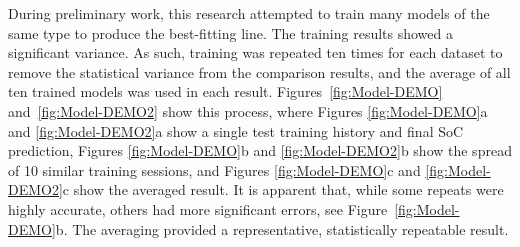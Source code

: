 %
During preliminary work, this research attempted to train many models of the same type to produce the best-fitting line.
The training results showed a significant variance.
As such, training was repeated ten times for each dataset to remove the statistical variance from the comparison results, and the average of all ten trained models was used in each result.
Figures~\ref{fig:Model-DEMO} and~\ref{fig:Model-DEMO2} show this process, where Figures \ref{fig:Model-DEMO}a and \ref{fig:Model-DEMO2}a show a single test training history and final SoC prediction, Figures \ref{fig:Model-DEMO}b and \ref{fig:Model-DEMO2}b show the spread of 10 similar training sessions, and Figures \ref{fig:Model-DEMO}c and \ref{fig:Model-DEMO2}c show the averaged result.
It is apparent that, while some repeats were highly accurate, others had more significant errors, see Figure~\ref{fig:Model-DEMO}b.
The averaging provided a representative, statistically repeatable result.
